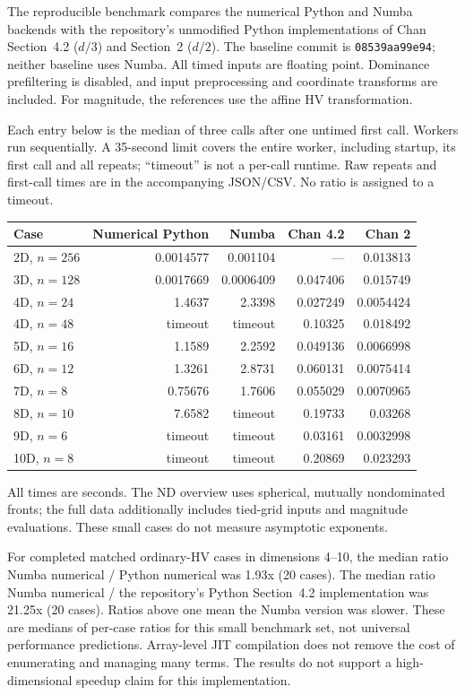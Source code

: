 The reproducible benchmark compares the numerical Python and Numba
backends with the repository's unmodified Python implementations of Chan
Section~4.2 ($d/3$) and Section~2 ($d/2$). The baseline commit is
\texttt{08539aa99e94}; neither baseline uses Numba. All timed inputs are
floating point. Dominance prefiltering is disabled, and input preprocessing
and coordinate transforms are included. For magnitude, the references use
the affine HV transformation.

Each entry below is the median of three calls after one untimed first call.
Workers run sequentially. A 35-second limit covers the entire worker,
including startup, its first call and all repeats; ``timeout'' is not a
per-call runtime. Raw repeats and first-call times are in the accompanying
JSON/CSV. No ratio is assigned to a timeout.

\begin{center}\small
\begin{tabular}{@{}lrrrr@{}}
\toprule
Case&Numerical Python&Numba&Chan 4.2&Chan 2\\
\midrule
2D, $n=256$&0.0014577&0.001104&---&0.013813\\
3D, $n=128$&0.0017669&0.0006409&0.047406&0.015749\\
4D, $n=24$&1.4637&2.3398&0.027249&0.0054424\\
4D, $n=48$&timeout&timeout&0.10325&0.018492\\
5D, $n=16$&1.1589&2.2592&0.049136&0.0066998\\
6D, $n=12$&1.3261&2.8731&0.060131&0.0075414\\
7D, $n=8$&0.75676&1.7606&0.055029&0.0070965\\
8D, $n=10$&7.6582&timeout&0.19733&0.03268\\
9D, $n=6$&timeout&timeout&0.03161&0.0032998\\
10D, $n=8$&timeout&timeout&0.20869&0.023293\\
\bottomrule
\end{tabular}
\end{center}
All times are seconds. The ND overview uses spherical, mutually
nondominated fronts; the full data additionally includes tied-grid inputs
and magnitude evaluations. These small cases do not measure asymptotic exponents.

For completed matched ordinary-HV cases in dimensions 4--10, the median ratio Numba numerical / Python numerical was 1.93x (20 cases). The median ratio Numba numerical / the repository's Python Section~4.2 implementation was 21.25x (20 cases). Ratios above one mean the Numba version was slower. These are medians of per-case ratios for this small benchmark set, not universal performance predictions. Array-level JIT compilation does not remove the cost of enumerating and managing many terms. The results do not support a high-dimensional speedup claim for this implementation.

